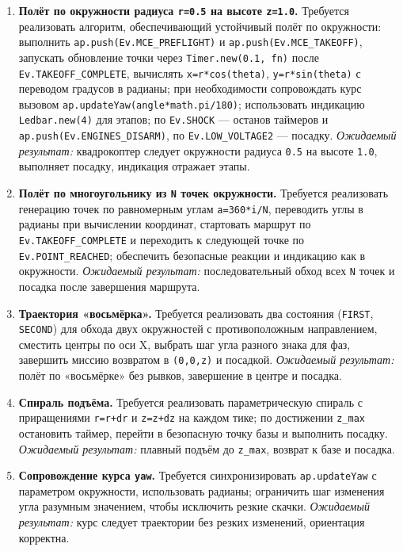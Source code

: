 \begin{enumerate}
  \item \textbf{Полёт по окружности радиуса \texttt{r=0.5} на высоте \texttt{z=1.0}.}
    Требуется реализовать алгоритм, обеспечивающий устойчивый полёт по окружности: выполнить \texttt{ap.push(Ev.MCE\_PREFLIGHT)} и \texttt{ap.push(Ev.MCE\_TAKEOFF)}, запускать обновление точки через \texttt{Timer.new(0.1, fn)} после \texttt{Ev.TAKEOFF\_COMPLETE}, вычислять \texttt{x=r*cos(theta)}, \texttt{y=r*sin(theta)} с переводом градусов в радианы; при необходимости сопровождать курс вызовом \texttt{ap.updateYaw(angle*math.pi/180)}; использовать индикацию \texttt{Ledbar.new(4)} для этапов; по \texttt{Ev.SHOCK} — останов таймеров и \texttt{ap.push(Ev.ENGINES\_DISARM)}, по \texttt{Ev.LOW\_VOLTAGE2} — посадку.
    \textit{Ожидаемый результат:} квадрокоптер следует окружности радиуса \texttt{0.5} на высоте \texttt{1.0}, выполняет посадку, индикация отражает этапы.
  \item \textbf{Полёт по многоугольнику из \texttt{N} точек окружности.}
    Требуется реализовать генерацию точек по равномерным углам \texttt{a=360*i/N}, переводить углы в радианы при вычислении координат, стартовать маршрут по \texttt{Ev.TAKEOFF\_COMPLETE} и переходить к следующей точке по \texttt{Ev.POINT\_REACHED}; обеспечить безопасные реакции и индикацию как в окружности.
    \textit{Ожидаемый результат:} последовательный обход всех \texttt{N} точек и посадка после завершения маршрута.
  \item \textbf{Траектория «восьмёрка».}
    Требуется реализовать два состояния (\texttt{FIRST}, \texttt{SECOND}) для обхода двух окружностей с противоположным направлением, сместить центры по оси X, выбрать шаг угла разного знака для фаз, завершить миссию возвратом в \texttt{(0,0,z)} и посадкой.
    \textit{Ожидаемый результат:} полёт по «восьмёрке» без рывков, завершение в центре и посадка.
  \item \textbf{Спираль подъёма.}
    Требуется реализовать параметрическую спираль с приращениями \texttt{r=r+dr} и \texttt{z=z+dz} на каждом тике; по достижении \texttt{z\_max} остановить таймер, перейти в безопасную точку базы и выполнить посадку.
    \textit{Ожидаемый результат:} плавный подъём до \texttt{z\_max}, возврат к базе и посадка.
  \item \textbf{Сопровождение курса \texttt{yaw}.}
    Требуется синхронизировать \texttt{ap.updateYaw} с параметром окружности, использовать радианы; ограничить шаг изменения угла разумным значением, чтобы исключить резкие скачки.
    \textit{Ожидаемый результат:} курс следует траектории без резких изменений, ориентация корректна.

\end{enumerate}
